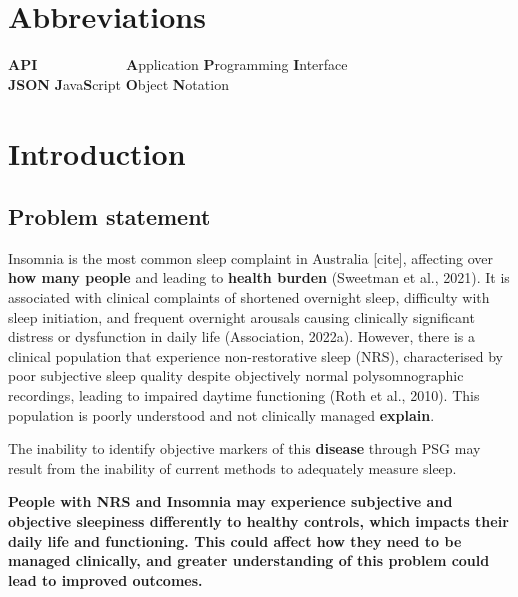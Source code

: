 \documentclass[
]{article}
\begin{document}
\newpage

\section*{Abbreviations}\label{abbreviations}

\begin{tabbing}
\textbf{API}~~~~~~~~~~~~ \= \textbf{A}pplication \textbf{P}rogramming \textbf{I}nterface \\  
\textbf{JSON} \> \textbf{J}ava\textbf{S}cript \textbf{O}bject \textbf{N}otation \\  
\end{tabbing}

\newpage

\setcounter{page}{1}
\doublespacing
\setlength{\parindent}{0.5in}

\section{Introduction}\label{introduction}

\subsection{Problem statement}\label{problem-statement}

Insomnia is the most common sleep complaint in Australia {[}cite{]},
affecting over \textbf{how many people} and leading to \textbf{health
burden} (Sweetman et al., 2021). It is associated with clinical
complaints of shortened overnight sleep, difficulty with sleep
initiation, and frequent overnight arousals causing clinically
significant distress or dysfunction in daily life (Association, 2022a).
However, there is a clinical population that experience non-restorative
sleep (NRS), characterised by poor subjective sleep quality despite
objectively normal polysomnographic recordings, leading to impaired
daytime functioning (Roth et al., 2010). This population is poorly
understood and not clinically managed \textbf{explain}.

The inability to identify objective markers of this \textbf{disease}
through PSG may result from the inability of current methods to
adequately measure sleep.

\textbf{People with NRS and Insomnia may experience subjective and
objective sleepiness differently to healthy controls, which impacts
their daily life and functioning. This could affect how they need to be
managed clinically, and greater understanding of this problem could lead
to improved outcomes.}
\end{document}
